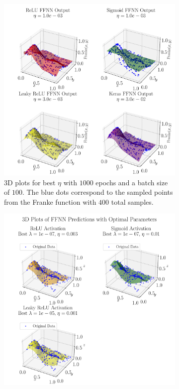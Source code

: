 \documentclass[%
reprint,
amsmath,amssymb,
aps,
]{revtex4-2}
\begin{document}
\begin{figure}[ht!]
\begin{subfigure}[b]{0.49\textwidth}
	\includegraphics[width=\textwidth]{Python/Figures/NN_3D_Predict_Franke_Epochs1000.pdf}
	\caption{3D plots for best $\eta$ with $1000$ epochs and a batch size of $100$. The blue dots correspond to the sampled points from the Franke function with $400$ total samples.}
	\label{fig:3D_Franke}
\end{subfigure}
\hfill
\begin{subfigure}[b]{0.49\textwidth}
	\includegraphics[width=\textwidth]{Python/Figures/NN_noKeras_3D_Franke_Epochs250.pdf}

\end{subfigure}
\end{figure}
\end{document}
